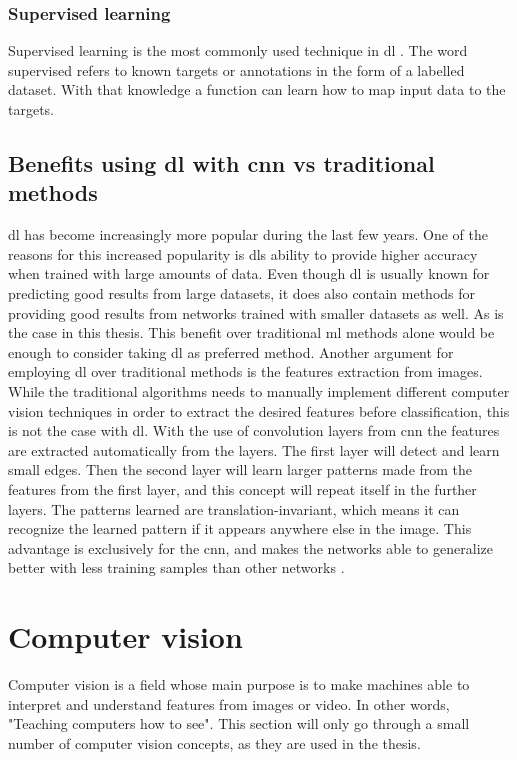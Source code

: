 \documentclass[USenglish]{ifimaster}  %
\begin{document}
\subsubsection{Supervised learning}
Supervised learning is the most commonly used technique in \ac{dl} \cite{Francois_Deep_learning_with_python}. The word supervised refers to known targets or annotations in the form of a labelled dataset. With that knowledge a function can learn how to map input data to the targets.

\subsection{Benefits using \ac{dl} with \ac{cnn} vs traditional methods}
\ac{dl} has become increasingly more popular during the last few years. One of the reasons for this increased popularity is \acp{dl} ability to provide higher accuracy when trained with large amounts of data. Even though \ac{dl} is usually known for predicting good results from large datasets, it does also contain methods for providing good results from networks trained with smaller datasets as well. As is the case in this thesis. This benefit over traditional \ac{ml} methods alone would be enough to consider taking \ac{dl} as preferred method.
\newline
\newline
Another argument for employing \ac{dl} over traditional methods is the features extraction from images. While the traditional algorithms needs to manually implement different computer vision techniques in order to extract the desired features before classification, this is not the case with \ac{dl}. With the use of convolution layers from \ac{cnn} the features are extracted automatically from the layers.
The first layer will detect and learn small edges. Then the second layer will learn larger patterns made from the features from the first layer, and this concept will repeat itself in the further layers. The patterns learned are translation-invariant, which means it can recognize the learned pattern if it appears anywhere else in the image. This advantage is exclusively for the \ac{cnn}, and makes the networks able to generalize better with less training samples than other networks  \cite{Francois_Deep_learning_with_python}.

\section{Computer vision}
Computer vision is a field whose main purpose is to make machines able to interpret and understand features from images or video. In other words, "Teaching computers how to see"\cite{website:maskinsyn-intro}. This section will only go through a small number of computer vision concepts, as they are used in the thesis.
\end{document}
